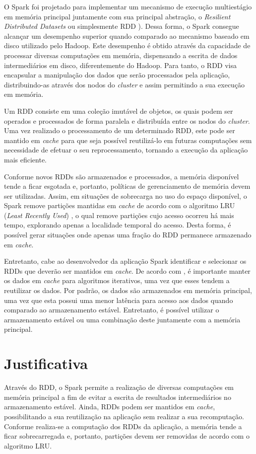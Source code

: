 O Spark foi projetado para implementar um mecanismo de execução multiestágio em memória principal juntamente com sua principal abstração, o \textit{Resilient Distributed Datasets} ou simplesmente RDD \cite{zaharia2012rdd}). Dessa forma, o Spark consegue alcançar um desempenho superior quando comparado ao mecanismo baseado em disco utilizado pelo Hadoop. Este desempenho é obtido através da capacidade de processar diversas computações em memória, dispensando a escrita de dados intermediários em disco, diferentemente do Hadoop. Para tanto, o RDD visa encapsular a manipulação dos dados que serão processados pela aplicação, distribuindo-as através dos nodos do \textit{cluster} e assim permitindo a sua execução em memória.

Um RDD consiste em uma coleção imutável de objetos, os quais podem ser operados e processados de forma paralela e distribuída entre os nodos do \textit{cluster}. Uma vez realizado o processamento de um determinado RDD, este pode ser mantido em \textit{cache} para que seja possível reutilizá-lo em futuras computações sem necessidade de efetuar o seu reprocessamento, tornando a execução da aplicação mais eficiente. 

Conforme novos RDDs são armazenados e processados, a memória disponível tende a ficar esgotada e, portanto, políticas de gerenciamento de memória devem ser utilizadas. Assim, em situações de sobrecarga no uso do espaço disponível, o Spark remove partições mantidas em \textit{cache} de acordo com o algoritmo LRU (\textit{Least Recently Used}) \cite{luu2018beginning}, o qual remove partições cujo acesso ocorreu há mais tempo, explorando apenas a localidade temporal do acesso. Desta forma, é possível gerar situações onde apenas uma fração do RDD permanece armazenado em \textit{cache}. 

Entretanto, cabe ao desenvolvedor da aplicação Spark identificar e selecionar os RDDs que deverão ser mantidos em \textit{cache}. De acordo com \cite{zecevic2016spark}, é importante manter os dados em \textit{cache} para algoritmos iterativos, uma vez que esses tendem a reutilizar os dados.  Por padrão, os dados são armazenados em memória principal, uma vez que esta possui uma menor latência para acesso aos dados quando comparado ao armazenamento estável. Entretanto, é possível utilizar o armazenamento estável ou uma combinação deste juntamente com a memória principal.

\section{Justificativa}
Através do RDD, o Spark permite a realização de diversas computações em memória principal a fim de evitar a escrita de resultados intermediários no armazenamento estável. Ainda, RDDs podem ser mantidos em \textit{cache}, possibilitando a sua reutilização na aplicação sem realizar a sua recomputação. Conforme realiza-se a computação dos RDDs da aplicação, a memória tende a ficar sobrecarregada e, portanto, partições devem ser removidas de acordo com o algoritmo LRU.

